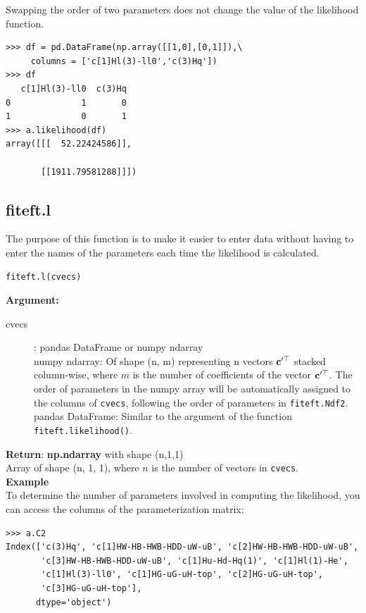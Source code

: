\documentclass[12pt]{article}
\def\b#1{\boldsymbol{\rm #1}}
\begin{document}
Swapping the order of two parameters does not change the value of the likelihood function.
\begin{verbatim}
>>> df = pd.DataFrame(np.array([[1,0],[0,1]]),\
     columns = ['c[1]Hl(3)-ll0','c(3)Hq'])
>>> df
   c[1]Hl(3)-ll0  c(3)Hq
0              1       0
1              0       1
>>> a.likelihood(df)
array([[[  52.22424586]],

       [[1911.79581288]]])
  \end{verbatim}

\subsection{fiteft.l}
The purpose of this function is to make it easier to enter data without having to enter the names of the parameters each time the likelihood is calculated.
\begin{verbatim}
fiteft.l(cvecs)
\end{verbatim}
\textbf{Argument:}
\begin{description}
  \item[cvecs]: pandas DataFrame or numpy ndarray\\
  numpy ndarray: Of shape (n, m) representing n vectors $\b c'^\top$ stacked column-wise, where $m$ is the number of coefficients of the vector $\b c'^\top$. The order of parameters in the numpy array will be automatically assigned to the columns of \verb|cvecs|, following the order of parameters in  \verb|fiteft.Ndf2|.\\
  pandas DataFrame: Similar to the argument of the function \verb|fiteft.likelihood()|.
 \end{description}
 \textbf{Return}: \textbf{np.ndarray} with shape (n,1,1)\\
 \indent Array of shape (n, 1, 1), where $n$ is the number of vectors in \verb|cvecs|.
 \\[1cm]
 \textbf{Example}\\
 To determine the number of parameters involved in computing the likelihood, you can access the columns of the parameterization matrix:
 \begin{verbatim}
>>> a.C2
Index(['c(3)Hq', 'c[1]HW-HB-HWB-HDD-uW-uB', 'c[2]HW-HB-HWB-HDD-uW-uB',
       'c[3]HW-HB-HWB-HDD-uW-uB', 'c[1]Hu-Hd-Hq(1)', 'c[1]Hl(1)-He',
       'c[1]Hl(3)-ll0', 'c[1]HG-uG-uH-top', 'c[2]HG-uG-uH-top',
       'c[3]HG-uG-uH-top'],
      dtype='object')
 \end{verbatim}
\end{document}
